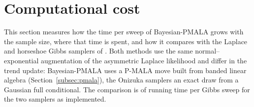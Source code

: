\section{Computational cost}
\label{sec:scalability}


This section measures how the time per sweep of Bayesian-PMALA grows with the sample size, where that time is spent, and how it compares with the Laplace and horseshoe Gibbs samplers of \citet{onizuka2024fast}. Both methods use the same normal--exponential augmentation of the asymmetric Laplace likelihood and differ in the trend update: Bayesian-PMALA uses a P-MALA move built from banded linear algebra (Section~\ref{subsec:pmala}), the Onizuka samplers an exact draw from a Gaussian full conditional. The comparison is of running time per Gibbs sweep for the two samplers as implemented.

